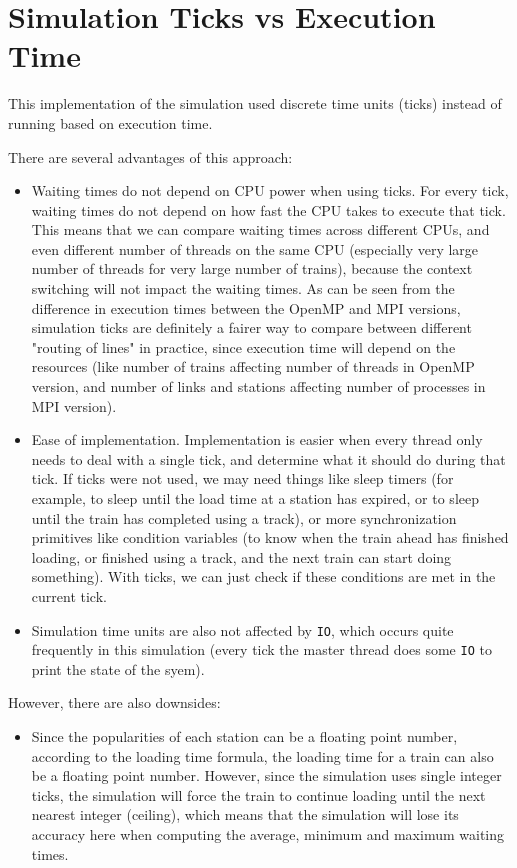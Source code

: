 \documentclass[12pt]{article}
\begin{document}
\section{Simulation Ticks vs Execution Time}

This implementation of the simulation used discrete time units (ticks) instead of running based on execution time.

\bigbreak \noindent There are several advantages of this approach:
\begin{itemize}
	\item Waiting times do not depend on CPU power when using ticks. For every tick, waiting times do not depend on how fast the CPU takes to execute that tick. This means that we can compare waiting times across different CPUs, and even different number of threads on the same CPU (especially very large number of threads for very large number of trains), because the context switching will not impact the waiting times. As can be seen from the difference in execution times between the OpenMP and MPI versions, simulation ticks are definitely a fairer way to compare between different "routing of lines" in practice, since execution time will depend on the resources (like number of trains affecting number of threads in OpenMP version, and number of links and stations affecting number of processes in MPI version).
	\item Ease of implementation. Implementation is easier when every thread only needs to deal with a single tick, and determine what it should do during that tick. If ticks were not used, we may need things like sleep timers (for example, to sleep until the load time at a station has expired, or to sleep until the train has completed using a track), or more synchronization primitives like condition variables (to know when the train ahead has finished loading, or finished using a track, and the next train can start doing something). With ticks, we can just check if these conditions are met in the current tick.
	\item Simulation time units are also not affected by \verb!IO!, which occurs quite frequently in this simulation (every tick the master thread does some \verb!IO! to print the state of the syem).
\end{itemize}

\bigbreak \noindent However, there are also downsides:
\begin{itemize}
	\item Since the popularities of each station can be a floating point number, according to the loading time formula, the loading time for a train can also be a floating point number. However, since the simulation uses single integer ticks, the simulation will force the train to continue loading until the next nearest integer (ceiling), which means that the simulation will lose its accuracy here when computing the average, minimum and maximum waiting times.
\end{itemize}
\end{document}
